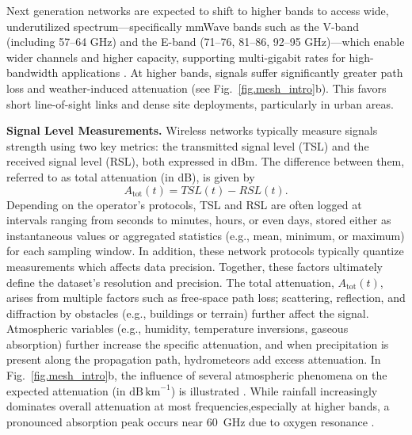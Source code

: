 \documentclass[manuscript]{copernicus}
\begin{document}
Next generation networks are expected to shift to higher bands to access wide, underutilized spectrum—specifically mmWave bands such as the V-band (including 57–64 GHz) and the E-band (71–76, 81–86, 92–95 GHz)—which enable wider channels and higher capacity, supporting multi-gigabit rates for high-bandwidth applications \citep{ashraf20245g,brake20165g}.
At higher bands, signals suffer significantly greater path loss and weather-induced attenuation (see Fig.~\ref{fig.mesh_intro}b). This favors short line-of-sight links and dense site deployments, particularly in urban areas.

\noindent \textbf{Signal Level Measurements.} Wireless networks typically measure signals strength using two key metrics: the transmitted signal level (TSL) and the received signal level (RSL), both expressed in dBm. The difference between them, referred to as total attenuation (in dB), is given by
\begin{equation} \label{eq.total_att}
    A_{\mathrm{tot}}(t) = TSL(t) - RSL(t).
\end{equation}
Depending on the operator’s protocols, TSL and RSL are often logged at intervals ranging 
from seconds to minutes, hours, or even days, stored either as instantaneous values or aggregated statistics (e.g., mean, minimum, or maximum) for each sampling window. In addition, these network protocols typically quantize measurements which affects data precision. Together, these factors ultimately define the dataset’s resolution and precision.
The total attenuation, $A_{\mathrm{tot}}(t)$, arises from multiple factors such as free‑space path loss; scattering, reflection, and diffraction by obstacles (e.g., buildings or terrain) further affect the signal.
Atmospheric variables (e.g., humidity, temperature inversions, gaseous absorption) further increase the specific attenuation, and when precipitation is present along the propagation path, hydrometeors add excess attenuation. 
In Fig.~\ref{fig.mesh_intro}b, the influence of several atmospheric phenomena on the expected attenuation (in $\mathrm{dB}\,\mathrm{km}^{-1}$) is illustrated \citep{ITU}. 
While rainfall increasingly dominates overall attenuation at most frequencies,especially at higher bands, a pronounced absorption peak occurs near 60~GHz due to oxygen resonance \citep{arvas2019analysis}.

\end{document}
